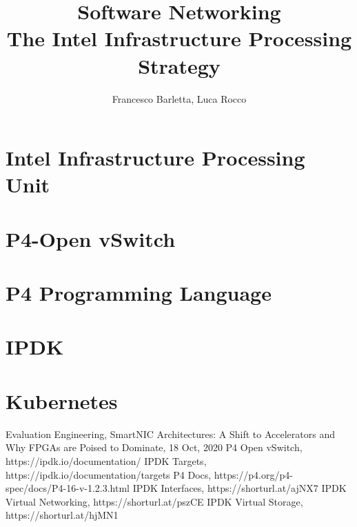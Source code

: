 \documentclass[11pt]{article}
\title{
    Software Networking \\
    \large The Intel Infrastructure Processing Strategy}
\begin{document}
\author{Francesco Barletta, Luca Rocco}

\maketitle

\tableofcontents

\clearpage

\section{Intel\raisebox {1mm}{\textregistered} Infrastructure Processing Unit}


\section{P4-Open vSwitch}


\section{P4 Programming Language}


\section{IPDK}


\section{Kubernetes}


\clearpage

\printnoidxglossary[type=acronym]
\printacronyms

\clearpage

\begin{thebibliography}{1}
    Evaluation Engineering, SmartNIC Architectures: A Shift to Accelerators and Why FPGAs are Poised to Dominate, 18 Oct, 2020
    P4 Open vSwitch, https://ipdk.io/documentation/
    IPDK Targets, https://ipdk.io/documentation/targets
    P4 Docs, https://p4.org/p4-spec/docs/P4-16-v-1.2.3.html
    IPDK Interfaces, https://shorturl.at/ajNX7
    IPDK Virtual Networking, https://shorturl.at/pszCE
    IPDK Virtual Storage, https://shorturl.at/hjMN1
\end{thebibliography}
\end{document}
